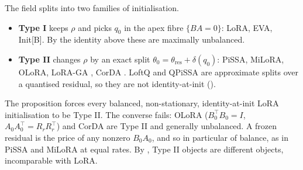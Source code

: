 \begin{explains}
The field splits into two families of initialisation.
\begin{itemize}
\item \textbf{Type I} keeps $\rho$ and picks $q_0$ in the apex fibre $\{BA=0\}$: LoRA, EVA, Init[B]. By the identity above these are maximally unbalanced.
\item \textbf{Type II} changes $\rho$ by an exact split $\theta_0=\theta_{\mathrm{res}}+\delta(q_0)$: PiSSA, MiLoRA, OLoRA, LoRA-GA \citep{wang2024lorab}, CorDA \citep{yang2024corda}. LoftQ \citep{li2023loftq} and QPiSSA \citep{meng2024pissa} are approximate splits over a quantised residual, so they are not identity-at-init ().
\end{itemize}
The proposition forces every balanced, non-stationary, identity-at-init LoRA initialisation to be Type II. The converse fails: OLoRA ($B_0^\top B_0=I$, $A_0A_0^\top=R_rR_r^\top$) and CorDA are Type II and generally unbalanced. A frozen residual is the price of any nonzero $B_0A_0$, and so in particular of balance, as in PiSSA and MiLoRA at equal rates. By , Type II objects are different objects, incomparable with LoRA.
\end{explains}
